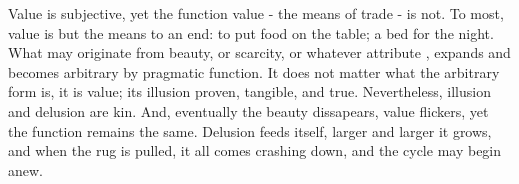 
Value is subjective, yet the function value - the means of trade - is not. To most, value is but the means to an end: to put food on the table; a bed for the night. What may originate from beauty, or scarcity, or whatever attribute , expands and becomes arbitrary by pragmatic function. It does not matter what the arbitrary form is, it is value; its illusion proven, tangible, and true. Nevertheless, illusion and delusion are kin. And, eventually the beauty dissapears, value flickers, yet the function remains the same. Delusion feeds itself, larger and larger it grows, and when the rug is pulled, it all comes crashing down, and the cycle may begin anew.   


